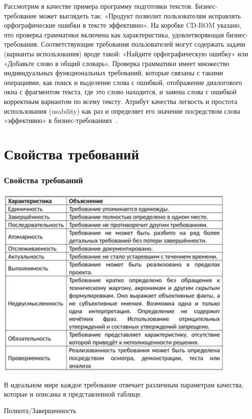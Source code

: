 \documentclass{../industrial-development}
\begin{document}
\lecturenotes

Рассмотрим в качестве примера программу подготовки текстов. Бизнес-требование может выглядеть так: «Продукт позволит пользователям исправлять орфографические ошибки в тексте эффективно». На коробке CD-ROM указано, что проверка грамматики включена как характеристика, удовлетворяющая бизнес-требования. Соответствующие требования пользователей могут содержать задачи (варианты использования) вроде такой: «Найдите орфографическую ошибку» или «Добавьте слово в общий словарь». Проверка грамматики имеет множество индивидуальных функциональных требований, которые связаны с такими операциями, как поиск и выделение слова с ошибкой, отображение диалогового окна с фрагментом текста, где это слово находится, и замена слова с ошибкой корректным вариантом по всему тексту. Атрибут качества легкость и простота использования (usability) как раз и определяет его значение посредством слова «эффективно» в бизнес-требованиях~\cite[с.~10--11]{Wiegers}.


\section{Свойства требований}
\begin{frame} \frametitle{Свойства требований}
  \centerline{\includegraphics[width=0.9\textwidth]{pict2.pdf}}
\end{frame}

\lecturenotes

В идеальном мире каждое требование отвечает различным параметрам качества, которые и описаны в представленной таблице.

\alert{Полнота/Завершенность}
\end{document}
